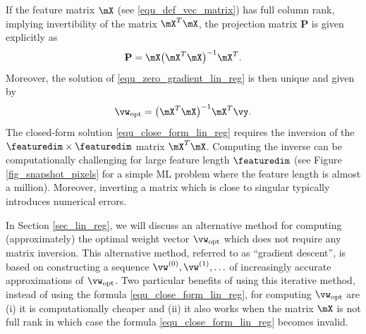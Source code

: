 \documentclass[12pt]{report}
\begin{document}
If the feature matrix $\mX$ (see \eqref{equ_def_vec_matrix}) has full column rank, implying invertibility of the matrix $\mX^{T} \mX$, 
the projection matrix $\mathbf{P}$ is given explicitly as 
\begin{equation} 
\nonumber
\mathbf{P} = \mX \big( \mX^{T} \mX \big)^{-1} \mX^{T}. 
\end{equation} 
Moreover, the solution of \eqref{equ_zero_gradient_lin_reg} is then unique and given by 
\begin{equation}
\label{equ_close_form_lin_reg}
\vw_{\rm opt} = \big(  \mX^{T} \mX \big)^{-1} \mX^{T} \vy. 
\end{equation}
The closed-form solution \eqref{equ_close_form_lin_reg} requires the inversion of the $\featuredim \times \featuredim$ 
matrix $\mX^{T} \mX$. Computing the inverse can be computationally challenging for large feature length $\featuredim$ 
(see Figure \ref{fig_snapshot_pixels} for a simple ML problem where the feature length is almost a million). Moreover, 
inverting a matrix which is close to singular typically introduces numerical errors. 



In Section \ref{sec_lin_reg}, we will discuss an alternative method for computing (approximately) the optimal weight 
vector $\vw_{\rm opt}$ which does not require any matrix inversion. This alternative method, referred to as ``gradient descent'', 
is based on constructing a sequence $\vw^{(0)}, \vw^{(1)},\ldots$ of increasingly accurate approximations of $\vw_{\rm opt}$. 
Two particular benefits of using this iterative method, instead of using the formula \eqref{equ_close_form_lin_reg}, for 
computing $\vw_{\rm opt}$ are (i) it is computationally cheaper and (ii) it also works when the matrix $\mX$ is not full 
rank in which case the formula \eqref{equ_close_form_lin_reg} becomes invalid. 
\end{document}
